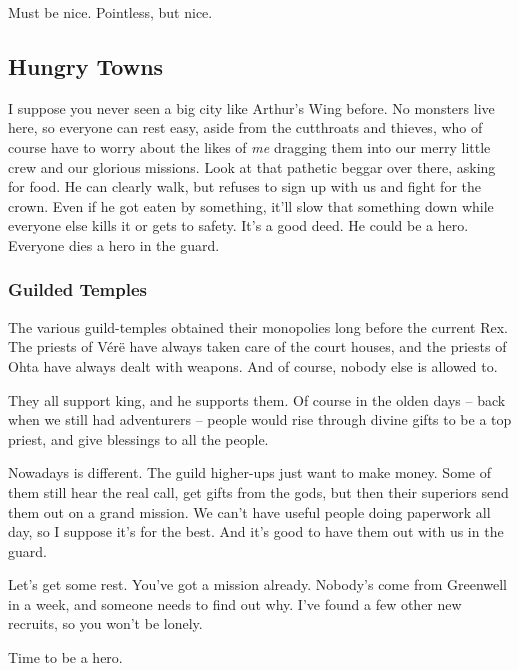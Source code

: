 \begin{multicols}{2}
\begin{exampletext}
  Must be nice.
  Pointless, but nice.
\end{exampletext}

\subsection*{Hungry Towns}

\begin{exampletext}

  I suppose you never seen a big city like Arthur's Wing before.
  No monsters live here, so everyone can rest easy, aside from the cutthroats and thieves, who of course have to worry about the likes of \emph{me} dragging them into our merry little crew and our glorious missions.
  Look at that pathetic beggar over there, asking for food.
  He can clearly walk, but refuses to sign up with us and fight for the crown.
  Even if he got eaten by something, it'll slow that something down while everyone else kills it or gets to safety.
  It's a good deed.
  He could be a hero.
  Everyone dies a hero in the \gls{guard}.

  \subsubsection*{Guilded Temples}

  The various guild-temples obtained their monopolies long before the current Rex.
  The priests of V\'er\"e have always taken care of the court houses, and the priests of Ohta have always dealt with weapons.
  And of course, nobody else is allowed to.

  They all support \gls{king}, and he supports them.
  Of course in the olden days -- back when we still had adventurers -- people would rise through divine gifts to be a top priest, and give blessings to all the people.

  Nowadays is different.
  The guild higher-ups just want to make money.
  Some of them still hear the real call, get gifts from the gods, but then their superiors send them out on a grand mission.
  We can't have useful people doing paperwork all day, so I suppose it's for the best.
  And it's good to have them out with us in the \gls{guard}.

  Let's get some rest.
  You've got a mission already.
  Nobody's come from Greenwell in a week, and someone needs to find out why.
  I've found a few other new recruits, so you won't be lonely.

  Time to be a hero.

\end{exampletext}

\end{multicols}


